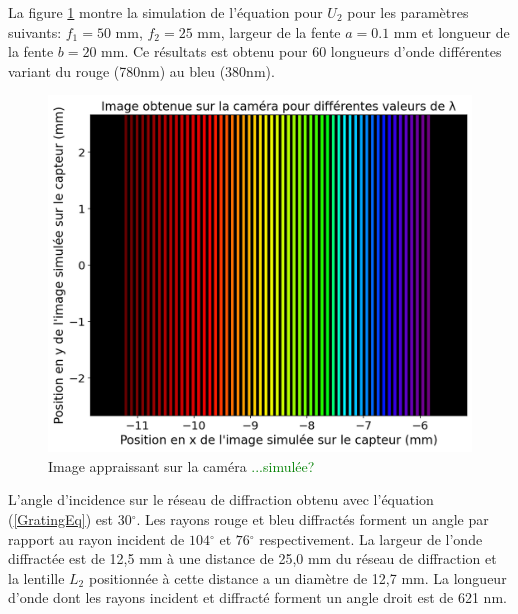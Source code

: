 \documentclass[conference]{IEEEtran}
\begin{document}
 La figure \ref{arc-en-ciel} montre la simulation de l'équation pour $U_2$ pour les paramètres suivants: 
 $f_1=50$ mm, $f_2=25$ mm, largeur de la fente $a=0.1$ mm et longueur de la fente $b=20$ mm. Ce résultats est obtenu pour
 60 longueurs d'onde différentes variant du rouge (780nm) au bleu (380nm). 
 \begin{figure}[H]
    \centering
    \includegraphics[scale=0.4]{simu2.png}
    \caption{Image appraissant sur la caméra \textcolor{green}{...simulée?}}
    \label{arc-en-ciel}
\end{figure}

L'angle d'incidence sur le réseau de diffraction obtenu avec l'équation (\ref{GratingEq})
est $30{^\circ}$. Les rayons rouge et bleu diffractés forment un angle par rapport
au rayon incident de $104{^\circ}$ et $76{^\circ}$ respectivement. La largeur de l'onde
diffractée est de 12,5 mm à une distance de 25,0 mm du réseau de diffraction et la lentille $L_2$
positionnée à cette distance a un diamètre de 12,7 mm. 
La longueur d'onde dont les rayons incident et diffracté forment un angle droit est de 621 nm.
\end{document}
